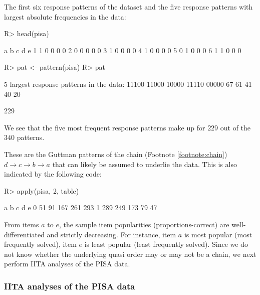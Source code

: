 \documentclass[nojss]{jss}
\begin{document}
The first six response patterns of the dataset and the five response patterns with largest 
absolute frequencies in the data:
\begin{Schunk}
\begin{Sinput}
R> head(pisa)
\end{Sinput}
\begin{Soutput}
  a b c d e
1 1 0 0 0 0
2 0 0 0 0 0
3 1 0 0 0 0
4 1 0 0 0 0
5 0 1 0 0 0
6 1 1 0 0 0
\end{Soutput}
\begin{Sinput}
R> pat <- pattern(pisa)
R> pat
\end{Sinput}
\begin{Soutput}
5 largest response patterns in the data:  
11100 11000 10000 11110 00000 
   67    61    41    40    20 
\end{Soutput}
\begin{Soutput}
[1] 229
\end{Soutput}
\end{Schunk}
We see that the five most frequent response patterns make up for $229$ out of the $340$ patterns.
 
These are the Guttman patterns of the chain (Footnote \ref{footnote:chain}) 
$d  \rightarrow c  \rightarrow b \rightarrow a$
that can likely be assumed to underlie the data. This is also indicated by the following code:
\begin{Schunk}
\begin{Sinput}
R> apply(pisa, 2, table)
\end{Sinput}
\begin{Soutput}
    a   b   c   d   e
0  51  91 167 261 293
1 289 249 173  79  47
\end{Soutput}
\end{Schunk}
From items $a$ to $e$, the sample item popularities (proportions-correct) are well-differentiated 
and strictly decreasing.
For instance, item $a$ is most popular (most frequently solved), item $e$ is least popular (least frequently solved). Since we do not know whether the underlying quasi order
may or may not be a chain, we next perform IITA analyses of the PISA data.

\subsubsection{IITA analyses of the PISA data}
\end{document}
